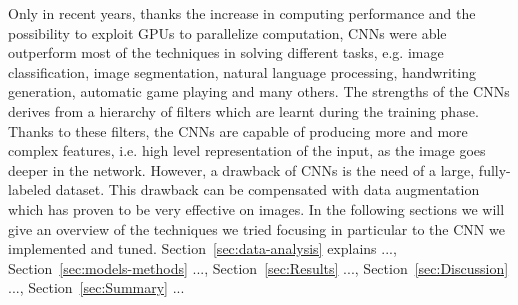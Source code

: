 \documentclass[10pt,conference,compsocconf]{IEEEtran}
\begin{document}
Only in recent years, thanks the increase in computing performance and the possibility to exploit GPUs to parallelize computation, CNNs were able outperform most of the techniques in solving different tasks, e.g. image classification, image segmentation, natural language processing, handwriting generation, automatic game playing and many others. The strengths of the CNNs derives from a hierarchy of filters which are learnt during the training phase. Thanks to these filters, the CNNs are capable of producing more and more complex features, i.e. high level representation of the input, as the image goes deeper in the network. However, a drawback of CNNs is the need of a large, fully-labeled dataset. This drawback can be compensated with data augmentation which has proven to be very effective on images. 
In the following sections we will give an overview of the techniques we tried focusing in particular to the CNN we implemented and tuned. Section~\ref{sec:data-analysis} explains ..., Section~\ref{sec:models-methods} ..., Section~\ref{sec:Results} ..., Section~\ref{sec:Discussion} ..., Section~\ref{sec:Summary} ...
\end{document}
